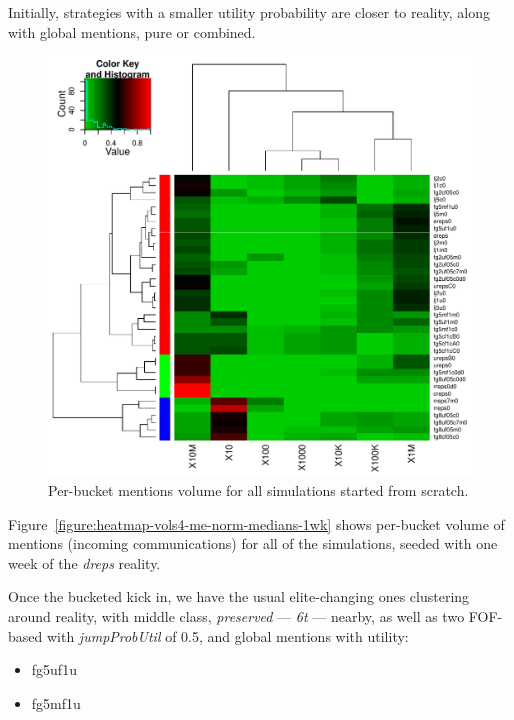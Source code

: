 \documentclass[10pt,oneside]{memoir}
\begin{document}
\begin{Spacing}{2}
Initially, strategies with a smaller utility probability are closer to reality, along with global mentions, pure or combined.



\begin{figure}
\begin{center}
    \includegraphics{figures/crop/heatmap-vols4-me-norm-medians-0wk}
    \caption{Per-bucket mentions volume for all simulations started from scratch.}
    \label{figure:heatmap-vols4-me-norm-medians-0wk}
\end{center}
\end{figure}
Figure~\ref{figure:heatmap-vols4-me-norm-medians-1wk} shows per-bucket volume of mentions (incoming communications) for all of the simulations, seeded with one week of the {\itshape dreps} reality.


Once the bucketed kick in, we have the usual elite-changing ones clustering around reality, with middle class, {\itshape preserved} --- {\itshape 6t} --- nearby, as well as two FOF-based with {\itshape jumpProbUtil} of 0.5, and global mentions with utility:


\begin{itemize}


\item fg5uf1u

\item fg5mf1u


\end{itemize}
\end{Spacing}
\end{document}
